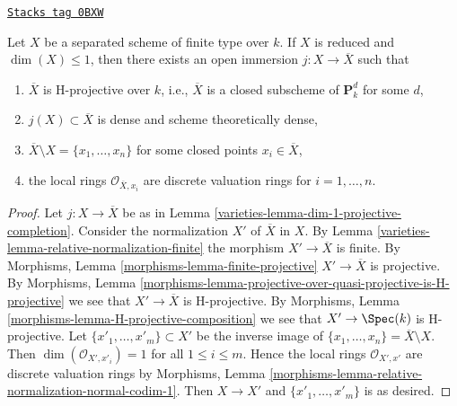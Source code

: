 \begin{lemma}
\label{varieties-lemma-reduced-dim-1-projective-completion}
\href{https://stacks.math.columbia.edu/tag/0BXW}{\texttt{Stacks tag 0BXW}}

Let $X$ be a separated scheme of finite type over $k$.
If $X$ is reduced and $\dim(X) \leq 1$, then there exists
an open immersion $j : X \to \overline{X}$ such that
\begin{enumerate}
\item $\overline{X}$ is H-projective over $k$, i.e., $\overline{X}$
is a closed subscheme of $\mathbf{P}^d_k$ for some $d$,
\item $j(X) \subset \overline{X}$ is dense and scheme
theoretically dense,
\item $\overline{X} \setminus X = \{x_1, \ldots, x_n\}$
for some closed points $x_i \in \overline{X}$,
\item the local rings $\mathcal{O}_{\overline{X}, x_i}$
are discrete valuation rings for $i = 1, \ldots, n$.
\end{enumerate}
\end{lemma}

\begin{proof}

Let $j : X \to \overline{X}$ be as in
Lemma \ref{varieties-lemma-dim-1-projective-completion}.
Consider the normalization $X'$ of $\overline{X}$ in
$X$. By Lemma \ref{varieties-lemma-relative-normalization-finite}
the morphism $X' \to \overline{X}$ is finite.
By Morphisms, Lemma \ref{morphisms-lemma-finite-projective}
$X' \to \overline{X}$ is projective. By Morphisms, Lemma
\ref{morphisms-lemma-projective-over-quasi-projective-is-H-projective}
we see that $X' \to \overline{X}$ is H-projective.
By Morphisms, Lemma \ref{morphisms-lemma-H-projective-composition}
we see that $X' \to \Spec(k)$ is H-projective.
Let $\{x'_1, \ldots, x'_m\} \subset X'$ be the inverse
image of $\{x_1, \ldots, x_n\} = \overline{X} \setminus X$.
Then $\dim(\mathcal{O}_{X', x'_i}) = 1$ for all $1 \leq i \leq m$.
Hence the local rings $\mathcal{O}_{X', x'}$
are discrete valuation rings by
Morphisms, Lemma
\ref{morphisms-lemma-relative-normalization-normal-codim-1}.
Then $X \to X'$ and $\{x'_1, \ldots, x'_m\}$ is as desired.
\end{proof}

